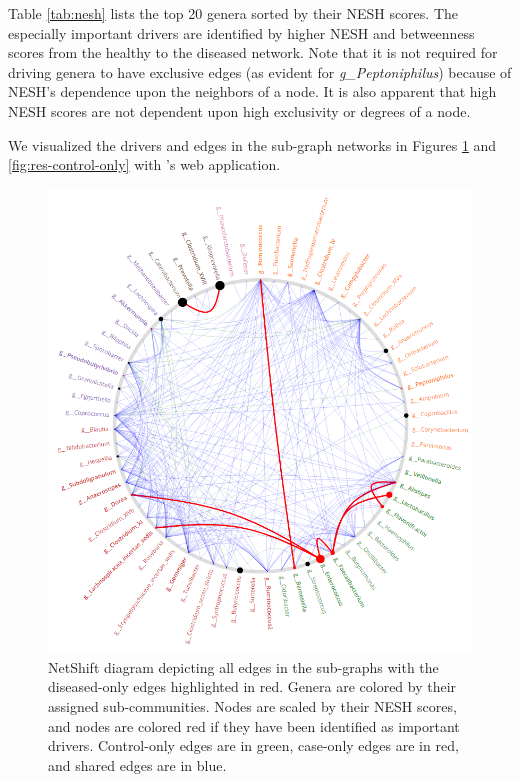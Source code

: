 Table \ref{tab:nesh} lists the top 20 genera sorted by their \acrshort{NESH} scores. The especially important drivers are identified by higher \acrshort{NESH} and betweenness scores from the healthy to the diseased network. Note that it is not required for driving genera to have exclusive edges (as evident for \textit{g\_Peptoniphilus}) because of \acrshort{NESH}'s dependence upon the neighbors of a node. It is also apparent that high \acrshort{NESH} scores are not dependent upon high exclusivity or degrees of a node.

We visualized the drivers and edges in the sub-graph networks in Figures \ref{fig:res-case-only} and \ref{fig:res-control-only} with \citeauthor{Kuntal2018}'s web application.
\begin{figure}[htb!]
    \centering
    \includegraphics[width=1.0\linewidth]{figure/results/case_only.png}
    \caption[NetShift diagram depicting all edges in the sub-graphs with the diseased-only edges highlighted in red.]{NetShift diagram depicting all edges in the sub-graphs with the diseased-only edges highlighted in red. Genera are colored by their assigned sub-communities. Nodes are scaled by their \acrshort{NESH} scores, and nodes are colored red if they have been identified as important drivers. Control-only edges are in green, case-only edges are in red, and shared edges are in blue.}
    \label{fig:res-case-only}
\end{figure}
